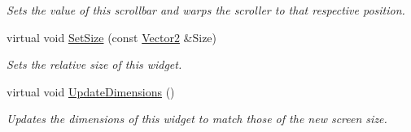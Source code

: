 \begin{DoxyCompactItemize}
\begin{DoxyCompactList}\small\item\em Sets the value of this scrollbar and warps the scroller to that respective position. \item\end{DoxyCompactList}\item 
virtual void \hyperlink{classMezzanine_1_1UI_1_1Scrollbar_a159e7f6c1493a30ec00da9001a04f8e9}{SetSize} (const \hyperlink{classMezzanine_1_1Vector2}{Vector2} \&Size)
\begin{DoxyCompactList}\small\item\em Sets the relative size of this widget. \item\end{DoxyCompactList}\item 
virtual void \hyperlink{classMezzanine_1_1UI_1_1Scrollbar_ad9e54e999910371173280b827f80f504}{UpdateDimensions} ()
\begin{DoxyCompactList}\small\item\em Updates the dimensions of this widget to match those of the new screen size. \item\end{DoxyCompactList}\end{DoxyCompactItemize}
